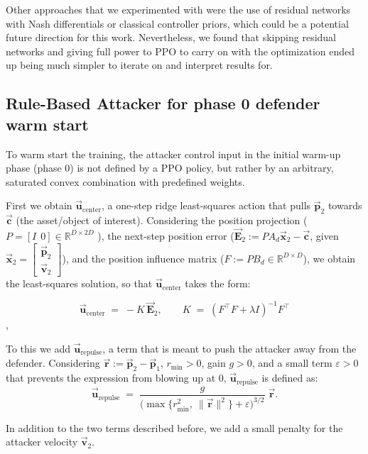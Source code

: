 Other approaches that we experimented with were the use of residual networks with Nash differentials or classical controller priors, which could be a potential future direction for this work. Nevertheless, we found that skipping residual networks and giving full power to PPO to carry on with the optimization ended up being much simpler to iterate on and interpret results for.

\subsection{Rule-Based Attacker for phase 0 defender warm start}
\label{subsec:rule-based-attacker-warm-start}
To warm start the training, the attacker control input in the initial warm-up phase (phase 0) is not defined by a PPO policy, but rather by an arbitrary, saturated convex combination with predefined weights.

First we obtain $\vec{\mathbf{u}}_{\text{center}}$, a one-step ridge least-squares action that pulls \(\vec{\mathbf{p}}_2\) towards \(\vec{\mathbf{c}}\) (the asset/object of interest). Considering the position projection (\(P=[I\ \ 0]\in\mathbb{R}^{D\times 2D}\) ), the next-step position error (\(\vec{\mathbf{E}}_2:= P A_d \vec{\mathbf{x}}_2 - \vec{\mathbf{c}}\), given \(\vec{\mathbf{x}}_2=\begin{bmatrix}\vec{\mathbf{p}}_2\\ \vec{\mathbf{v}}_2\end{bmatrix}\)), and the position influence matrix (\(F := P B_d \in\mathbb{R}^{D\times D}\)), we obtain the least-squares solution, so that $\vec{\mathbf{u}}_{\text{center}}$ takes the form:

\[
\vec{\mathbf{u}}_{\text{center}} \;=\; - K\,\vec{\mathbf{E}}_2,\qquad
K \;=\; (F^\top F + \lambda I)^{-1} F^\top
\],

To this we add \(\vec{\mathbf{u}}_{\text{repulse}}\), a term that is meant to push the attacker away from the defender. Considering \(\vec{\mathbf{r}} := \vec{\mathbf{p}}_2-\vec{\mathbf{p}}_1\), \(r_{\min}>0\), gain \(g>0\), and a small term \(\varepsilon > 0\) that prevents the expression from blowing up at 0, \(\vec{\mathbf{u}}_{\text{repulse}}\) is defined as:
\[
\vec{\mathbf{u}}_{\text{repulse}} \;=\; \frac{g}{\big(\max\{r_{\min}^2,\ \|\vec{\mathbf{r}}\|^2\}+\varepsilon\big)^{3/2}}\; \vec{\mathbf{r}}.
\]

In addition to the two terms described before, we add a small penalty for the attacker velocity \(\vec{\mathbf{v}}_2\).


